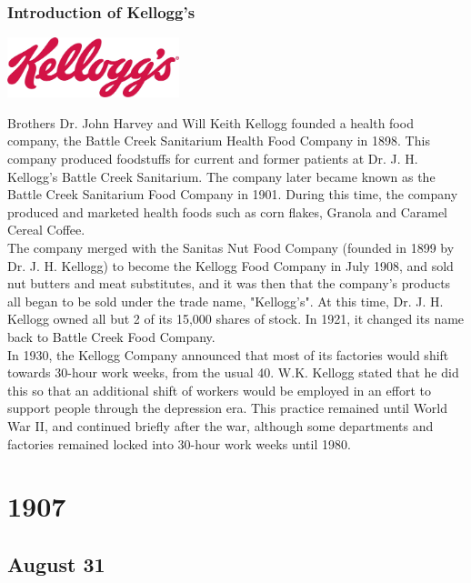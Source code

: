 \documentclass[11pt]{report}
\begin{document}
\subsection{Introduction of Kellogg's}
\vspace{2mm}\begin{center}\includegraphics[width=5cm]{./img/kelloggsLogo.jpg}\end{center}
Brothers Dr. John Harvey and Will Keith Kellogg founded a health food company, the Battle Creek Sanitarium Health Food Company in 1898. This company produced foodstuffs for current and former patients at Dr. J. H. Kellogg's Battle Creek Sanitarium. The company later became known as the Battle Creek Sanitarium Food Company in 1901. During this time, the company produced and marketed health foods such as corn flakes, Granola and Caramel Cereal Coffee.\\ \indent The company merged with the Sanitas Nut Food Company (founded in 1899 by Dr. J. H. Kellogg) to become the Kellogg Food Company in July 1908, and sold nut butters and meat substitutes, and it was then that the company's products all began to be sold under the trade name, "Kellogg's". At this time, Dr. J. H. Kellogg owned all but 2 of its 15,000 shares of stock. In 1921, it changed its name back to Battle Creek Food Company.\\
\indent In 1930, the Kellogg Company announced that most of its factories would shift towards 30-hour work weeks, from the usual 40. W.K. Kellogg stated that he did this so that an additional shift of workers would be employed in an effort to support people through the depression era. This practice remained until World War II, and continued briefly after the war, although some departments and factories remained locked into 30-hour work weeks until 1980.

\chapter{1907}
\section{August 31}
\end{document}
